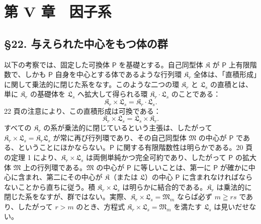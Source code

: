 \section*{第 V 章　因子系}\label{kapitel-v.-faktorensysteme}

\subsection*{\S 22. 与えられた中心をもつ体の群}\label{die-gruppe-der-koerper-mit-gegebenem-zentrum}

以下の考察では、固定した可換体 \(\mathsf P\) を基礎とする。自己同型体 \(\mathfrak K\) が \(\mathsf P\) 上有限階数で、しかも \(\mathsf P\) 自身を中心とする体であるような行列環 \(\mathfrak K_r\) 全体は、「直積形成」に関して乗法的に閉じた系をなす。このような二つの環 \(\mathfrak K_r\) と \(\mathfrak L_s\) の直積とは、単に \(\mathfrak K_r\) の基礎体を \(\mathfrak L_s\) へ拡大して得られる環 \(\mathfrak K_r\cdot\mathfrak L_s\) のことである：
\[
\mathfrak K_r\times\mathfrak L_s=\mathfrak K_r\cdot\mathfrak L_s.
\]
22 頁の注意により、この直積形成は可換である：
\[
\mathfrak K_r\times\mathfrak L_s=\mathfrak L_s\times\mathfrak K_r.
\]
すべての \(\mathfrak K_r\) の系が乗法的に閉じているという主張は、したがって \(\mathfrak K_r\times\mathfrak L_s=\mathfrak K_r\mathfrak L_s\) が常に再び行列環であり、その自己同型体 \(\mathfrak M\) の中心が \(\mathsf P\) である、ということにほかならない。\(\mathsf P\) に関する有限階数性は明らかである。20 頁の定理 1 により、\(\mathfrak K_r\times\mathfrak L_s\) は両側単純かつ完全可約であり、したがって \(\mathsf P\) の拡大体 \(\mathfrak M\) 上の行列環である。\(\mathfrak M\) の中心が \(\mathsf P\) に等しいことは、第一に \(\mathsf P\) が確かに中心に含まれ、第二にその中心が \(\mathfrak K\)（または \(\mathfrak L\)）の中心 \(\mathsf P\) に含まれなければならないことから直ちに従う。積 \(\mathfrak K_r\times\mathfrak L_s\) は明らかに結合的である。\(\mathfrak K_r\) は乗法的に閉じた系をなすが、群ではない。実際、\(\mathfrak K_r\times\mathfrak L_s=\mathfrak M_m\) ならば必ず \(m\geqq rs\) であり、したがって \(r>m\) のとき、方程式 \(\mathfrak K_r\times\mathfrak L_s=\mathfrak M_m\) を満たす \(\mathfrak L_s\) は見いだせない。

